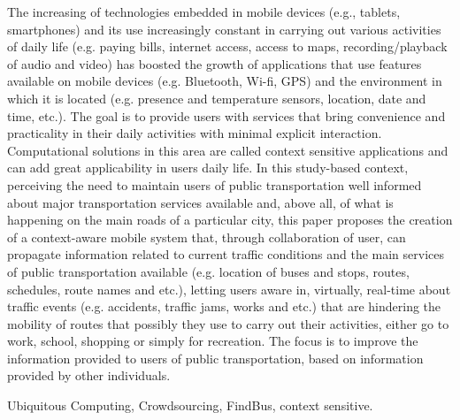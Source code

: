 The increasing of technologies embedded in mobile devices (e.g., tablets, smartphones) and its use increasingly constant in carrying out various activities of daily life (e.g. paying bills, internet access, access to maps, recording/playback of audio and video) has boosted the growth of applications that use features available on mobile devices (e.g. Bluetooth, Wi-fi, GPS) and the environment in which it is located (e.g. presence and temperature sensors, location, date and time, etc.). The goal is to provide users with services that bring convenience and practicality in their daily activities with minimal explicit interaction. Computational solutions in this area are called context sensitive applications and can add great applicability in users daily life. In this study-based context, perceiving the need to maintain users of public transportation well informed about major transportation services available and, above all, of what is happening on the main roads of a particular city, this paper proposes the creation of a context-aware mobile system that, through collaboration of user, can propagate information related to current traffic conditions and the main services of public transportation available (e.g. location of buses and stops, routes, schedules, route names and etc.), letting users aware in, virtually, real-time about traffic events (e.g. accidents, traffic jams, works and etc.) that are hindering the mobility of routes that possibly they use to carry out their activities, either go to work, school, shopping or simply for recreation. The focus is to improve the information provided to users of public transportation, based on information provided by other individuals.

\begin{keywords}
Ubiquitous Computing, Crowdsourcing, FindBus, context sensitive.
\end{keywords}